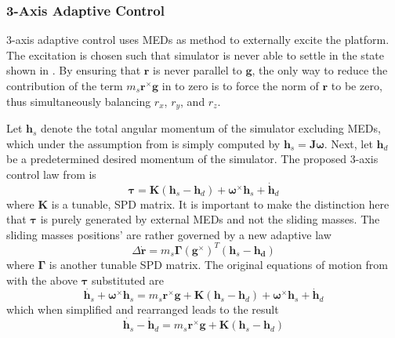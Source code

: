 \subsubsection{3-Axis Adaptive Control}\label{sec:3_axis_adaptive}
3-axis adaptive control uses MEDs as method to externally excite the platform. The excitation is chosen such that simulator is never able to settle in the state shown in . By ensuring that $\bm{r}$ is never parallel to $\bm{g}$, the only way to reduce the contribution of the term $m_s\bm{r}^{\times}\bm{g}$ in  to zero is to force the norm of $\bm{r}$ to be zero, thus simultaneously balancing $r_x$, $r_y$, and $r_z$. 

Let $\bm{h}_s$ denote the total angular momentum of the simulator excluding MEDs, which under the assumption from  is simply computed by $\bm{h}_s=\bm{J\omega}$. Next, let $\bm{h}_d$ be a predetermined desired momentum of the simulator. The proposed 3-axis control law from \cite{kim_automatic_2009} is
\begin{equation}
    \bm{\tau}=\bm{K}(\bm{h}_s-\bm{h}_d)+\bm{\omega}^{\times}\bm{h}_s+\dot{\bm{h}}_d
\end{equation}
where $\bm{K}$ is a tunable, SPD matrix. It is important to make the distinction here that $\bm{\tau}$ is purely generated by external MEDs and not the sliding masses. The sliding masses positions' are rather governed by a new adaptive law
\begin{equation}\label{equation:3_axis_adaptive_law}
    \Delta\dot{\bm{r}}=m_s\bm{\Gamma}(\bm{g}^{\times})^T(\bm{h}_s-\bm{h_d})
\end{equation}
where $\bm{\Gamma}$ is another tunable SPD matrix. The original equations of motion from  with the above $\bm{\tau}$ substituted are
\begin{equation}
    \dot{\bm{h}_s}+\bm{\omega}^{\times}\bm{h}_s=m_s\bm{r}^{\times}\bm{g}+
    \bm{K}(\bm{h}_s-\bm{h}_d)+\bm{\omega}^{\times}\bm{h}_s+\dot{\bm{h}}_d
\end{equation}
which when simplified and rearranged leads to the result
\begin{equation}\label{equation:h_dot_result}
    \dot{\bm{h}_s}-\dot{\bm{h}}_d=m_s\bm{r}^{\times}\bm{g}+
    \bm{K}(\bm{h}_s-\bm{h}_d)
\end{equation}

